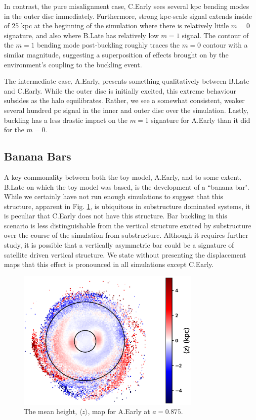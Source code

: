 In contrast, the pure misalignment case, C.Early sees several kpc bending modes in the outer disc immediately. Furthermore, strong kpc-scale signal extends inside of 25 kpc at the beginning of the simulation where there is relatively little $m=0$ signature, and also where B.Late has relatively low $m=1$ signal. The contour of the $m=1$ bending mode post-buckling roughly traces the $m=0$ contour with a similar magnitude, suggesting a superposition of effects brought on by the environment's coupling to the buckling event.

The intermediate case, A.Early, presents something qualitatively between B.Late and C.Early. While the outer disc is initially excited, this extreme behaviour subsides as the halo equilibrates. Rather, we see a somewhat consistent, weaker several hundred pc signal in the inner and outer disc over the simulation. Lastly, buckling has a less drastic impact on the $m=1$ signature for A.Early than it did for the $m=0$.

\subsection{Banana Bars} \label{ssec:another}



A key commonality between both the toy model, A.Early, and to some extent, B.Late on which the toy model was based, is the development of a ``banana bar". While we certainly have not run enough simulations to suggest that this structure, apparent in Fig. \ref{fig:a_early_displacement}, is ubiquitous in substructure dominated systems, it is peculiar that C.Early does not have this structure. Bar buckling in this scenario is less distinguishable from the vertical structure excited by substructure over the course of the simulation from substructure. Although it requires further study, it is possible that a vertically asymmetric bar could be a signature of satellite driven vertical structure. We state without presenting the displacement maps that this effect is pronounced in all simulations except C.Early.



\begin{figure}
	\centering
	\includegraphics[width=0.8\textwidth]{../figures/a_early_displacement_a_0_875.eps}
	\caption{The mean height, $\langle z \rangle$, map for A.Early at $a=0.875$.}\label{fig:a_early_displacement}
\end{figure}




